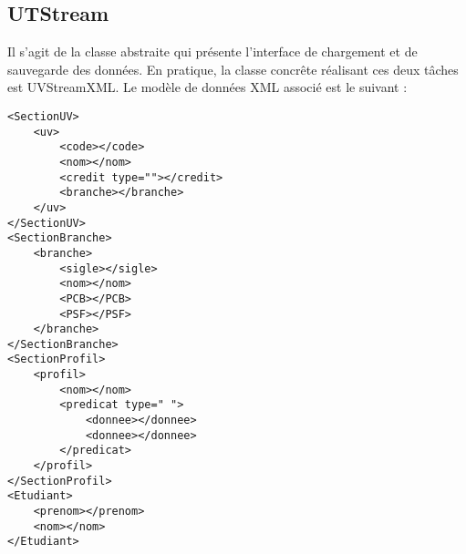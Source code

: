 \documentclass[a4paper,10pt,french]{report}
\begin{document}
			\paragraph{}
		\subsubsection{}
			\paragraph{}
			\paragraph{}
			\paragraph{}
		\subsubsection{}
			\paragraph{}
			\paragraph{}
			\paragraph{}
				
	\subsection{UTStream}\label{subsec:UTStream}
	
		Il s'agit de la classe abstraite qui présente l'interface de chargement et de sauvegarde des données.
		En pratique, la classe concrête réalisant ces deux tâches est UVStreamXML. Le modèle de données XML associé est le suivant :
		\begin{verbatim}
<SectionUV>
	<uv>
		<code></code>
		<nom></nom>
		<credit type=""></credit>
		<branche></branche>
	</uv>
</SectionUV>
<SectionBranche>
	<branche>
		<sigle></sigle>
		<nom></nom>
		<PCB></PCB>
		<PSF></PSF>
	</branche>
</SectionBranche>
<SectionProfil>
	<profil>
		<nom></nom>		
		<predicat type=" "> 
			<donnee></donnee>
			<donnee></donnee>
		</predicat>
	</profil>
</SectionProfil>
<Etudiant>
	<prenom></prenom>
	<nom></nom>
</Etudiant>
		\end{verbatim}
		
\end{document}
